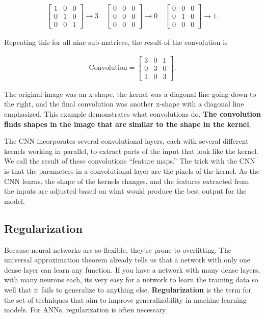 \begin{align}
    \begin{bmatrix}
        1 & 0 & 0 \\
        0 & 1 & 0 \\
        0 & 0 & 1 
    \end{bmatrix}\rightarrow3 \quad
    \begin{bmatrix}
        0 & 0 & 0\\
        0 & 0 & 0\\
        0 & 0 & 0
    \end{bmatrix}\rightarrow0 \quad
    \begin{bmatrix}
        0 & 0 & 0 \\
        0 & 1 & 0 \\
        0 & 0 & 0
    \end{bmatrix}\rightarrow1.
\end{align}

\noindent Repeating this for all nine sub-matrices, the result of the convolution is

\begin{align}
    \text{Convolution}=
    \begin{bmatrix}
        3 & 0 & 1 \\
        0 & 3 & 0 \\
        1 & 0 & 3 
    \end{bmatrix}.
\end{align}

The original image was an x-shape, the kernel was a diagonal line going down to the right, and the final convolution was another x-shape with a diagonal line emphasized. This example demonstrates what convolutions do. \textbf{The convolution finds shapes in the image that are similar to the shape in the kernel}.

The CNN incorporates several convolutional layers, each with several different kernels working in parallel, to extract parts of the input that look like the kernel. We call the result of these convolutions ``feature maps.'' The trick with the CNN is that the parameters in a convolutional layer are the pixels of the kernel. As the CNN learns, the shape of the kernels changes, and the features extracted from the inputs are adjusted based on what would produce the best output for the model.

\subsection*{Regularization}
Because neural networks are so flexible, they're prone to overfitting. The universal approximation theorem already tells us that a network with only one dense layer can learn any function. If you have a network with many dense layers, with many neurons each, its very easy for a network to learn the training data so well that it fails to generalize to anything else. \textbf{Regularization} is the term for the set of techniques that aim to improve generalizability in machine learning models. For ANNs, regularization is often necessary.

